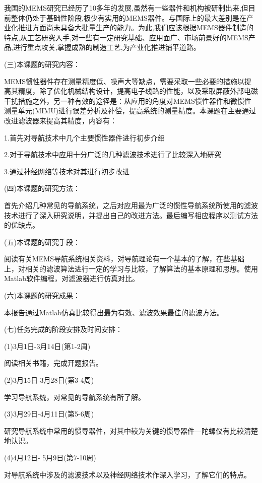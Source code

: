{我国的MEMS研究已经历了10多年的发展,虽然有一些器件和机构被研制出来,但目前整体仍处于基础性阶段,极少有实用的MEMS器件。与国际上的最大差别是在产业化推进方面尚未具备大批量生产的能力。为此,我们应该根据MEMS器件制造的特点,从工艺研究入手,对一些有一定研究基础、应用面广、市场前景好的MEMS产品,进行重点攻关,掌握成熟的制造工艺,为产业化推进铺平道路。

{\noindent\heiti (三)本课题的研究内容：}

MEMS惯性器件存在测量精度低、噪声大等缺点，需要采取一些必要的措施以提高其精度，除了优化机械结构设计，提高电子线路的性能，以及采取屏蔽外部电磁干扰措施之外，另一种有效的途径是：从应用的角度对MEMS惯性器件和微惯性测量单元(MIMU)进行误差分析及补偿，提高系统的测量精度。本课题在主要通过改进滤波器来提高其精度，内容有：

1.首先对导航技术中几个主要惯性器件进行初步介绍

2.对于导航技术中应用十分广泛的几种滤波技术进行了比较深入地研究

3.通过神经网络等技术对其进行初步改进

{\noindent\heiti (四)本课题的研究方法：}

首先介绍几种常见的导航系统，之后对应用最为广泛的惯性导航系统所使用的滤波技术进行了深入研究说明，并提出自己的改进方法。最后编写相应程序以测试方法的优缺点。

\myoverlay%

{\noindent\heiti (五)本课题的研究手段：}

阅读有关MEMS导航系统相关资料，对导航理论有一个基本的了解，在些基础上，对相关的滤波算法进行一定的学习与比较，了解算法的基本原理和思想。使用Matlab软件编程，对滤波器进行仿真对比。	

{\noindent\heiti (六)本课题的研究成果：}

本报告通过Matlab仿真比较得出最为有效、滤波效果最佳的滤波方法。

     {\noindent\heiti (七)任务完成的阶段安排及时间安排：}

(1)3月1日-3月14日(第1-2周)

阅读相关书籍，完成开题报告。

(2)3月15日-3月28日(第3-4周)

学习导航系统，对常见的导航系统有所了解。

(3)3月29日-4月11日(第5-6周)

研究导航系统中常用的惯导器件，对其中较为关键的惯导器件—陀螺仪有比较清楚地认识。

(4)4月12日- 5月9日(第7-10周)

对导航系统中涉及的滤波技术以及神经网络技术作深入学习，了解它们的特点。

}
